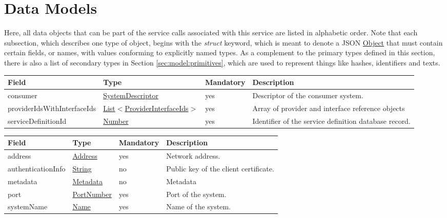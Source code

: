 \documentclass[a4paper]{arrowhead}
\newcommand{\pref}[1]{{\textcolor{ArrowheadGrey}{\hyperref[sec:model:primitives:#1]{#1}}}}
\begin{document}
\newpage

\section{Data Models}
\label{sec:model}

Here, all data objects that can be part of the service calls associated with this service are listed in alphabetic order.
Note that each subsection, which describes one type of object, begins with the \textit{struct} keyword, which is meant to denote a JSON \pref{Object} that must contain certain fields, or names, with values conforming to explicitly named types.
As a complement to the primary types defined in this section, there is also a list of secondary types in Section \ref{sec:model:primitives}, which are used to represent things like hashes, identifiers and texts.

\label{sec:model:CheckAuthRuleRequest}
 
\begin{table}[ht!]
\begin{tabularx}{\textwidth}{| p{5cm} | p{4cm} | p{2cm} | X |} \hline
\rowcolor{gray!33} Field & Type & Mandatory & Description \\ \hline
consumer & \hyperref[sec:model:SystemDescriptor]{SystemDescriptor} & yes & Descriptor of the consumer system. \\ \hline
providerIdsWithInterfaceIds & \pref{List}$<$\hyperref[sec:model:ProviderInterfaceIds]{ProviderInterfaceIds}$>$ & yes & Array of provider and interface reference objects \\ \hline
serviceDefinitionId &\pref{Number} & yes & Identifier of the service definition database record. \\ \hline
\end{tabularx}
\end{table}

\label{sec:model:SystemDescriptor}

\begin{table}[ht!]
\begin{tabularx}{\textwidth}{| p{3cm} | p{3cm} | p{2cm} | X |} \hline
\rowcolor{gray!33} Field & Type & Mandatory & Description \\ \hline
address & \pref{Address} & yes & Network address. \\ \hline
authenticationInfo & \pref{String} & no & Public key of the client certificate. \\ \hline
metadata & \hyperref[sec:model:Metadata]{Metadata} & no & Metadata \\ \hline
port & \pref{PortNumber} & yes & Port of the system. \\ \hline
systemName &\pref{Name} & yes & Name of the system. \\ \hline
\end{tabularx}
\end{table}
\end{document}
